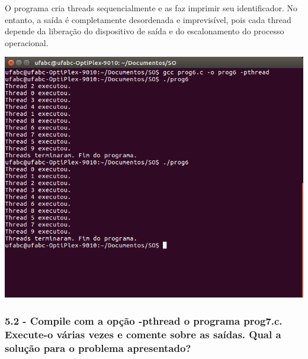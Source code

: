 O programa cria threads sequencialmente e as faz imprimir seu identificador. No entanto, a saída é completamente desordenada e imprevisível, pois cada thread depende da liberação do dispositivo de saída e do escalonamento do processo operacional.

\vspace{2em}
\begin{minipage}{\textwidth}
    \hspace{-1em}
    \centering
    \includegraphics[trim=0 110 0 0,clip,scale=.4]{pratica1/prog6.png}
    \label{prog4modpng}
    \hspace{1em}
\end{minipage}

\subsubsection{5.2 - Compile com a opção -pthread o programa prog7.c. Execute-o várias vezes e comente sobre as saídas. Qual a solução para o problema apresentado?}

\vspace{-0.5em}
\begin{minipage}{\textwidth}
  \hspace{-1em}
  \centering
  
  \label{prog4mod}
  \hspace{1em}
\end{minipage}
\vspace{0.5em}

